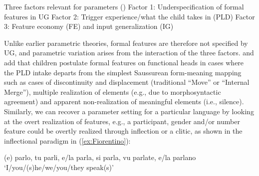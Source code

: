 \documentclass[output=paper,colorlinks,citecolor=brown]{langscibook}
\begin{document}
\ea Three factors relevant for parameters (\cite[7]{mm:roberts_parameter_2019})
\ea Factor 1: Underspecification of formal features in UG
\ex Factor 2: Trigger experience/what the child takes in (PLD)
\ex Factor 3: Feature economy (FE) and input generalization (IG)
\z
\z

\noindent Unlike earlier parametric theories, formal features are therefore not specified by UG, and parametric variation arises from the interaction of the three factors. \citet{mm:biberauer_syntax_2015} and \citet{mm:biberauer_factors_2019} add that children postulate formal features on functional heads in cases where the PLD intake departs from the simplest Saussurean form\hyp meaning mapping such as cases of discontinuity and displacement (traditional “Move” or “Internal Merge”), multiple realization of elements (e.g., due to morphosyntactic agreement) and apparent non-realization of meaningful elements (i.e., silence). Similarly, we can recover a parameter setting for a particular language by looking at the overt realization of features, e.g., a participant, gender and/or number feature could be overtly realized through inflection or a clitic, as shown in the  inflectional paradigm in (\ref{ex:Fiorentino}):

\ea 
(e) parlo, tu parli, e/la parla, si parla, vu parlate, e/la parlano\\
`I/you/(s)he/we/you/they speak(s)' 
\label{ex:Fiorentino}
\z 
\end{document}
